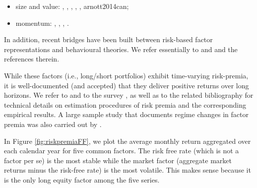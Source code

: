 \documentclass[]{krantz}
\providecommand{\tightlist}{%
  \setlength{\itemsep}{0pt}\setlength{\parskip}{0pt}}
\theoremstyle{definition}
\theoremstyle{definition}
\theoremstyle{definition}
\theoremstyle{remark}
\begin{document}
\begin{itemize}
\tightlist
\item
  size and value: \citet{berk1999optimal},
  \citet{daniel2001overconfidence}, \citet{barberis2003style},
  \citet{gomes2003equilibrium}, \citet{carlson2004corporate},
  arnott2014can;
\item
  momentum: \citet{johnson2002rational}, \citet{grinblatt2005prospect},
  \citet{vayanos2013institutional}, \citet{choi2014momentum}.
\end{itemize}

In addition, recent bridges have been built between risk-based factor
representations and behavioural theories. We refer essentially to
\citet{barberis2016prospect} and \citet{daniel2019short} and the
references therein.

While these factors (i.e., long/short portfolios) exhibit time-varying
risk-premia, it is well-documented (and accepted) that they deliver
positive returns over long horizons. We refer to
\citet{gagliardini2016time} and to the survey
\citet{gagliardini2019estimation}, as well as to the related
bibliography for technical details on estimation procedures of risk
premia and the corresponding empirical results. A large sample study
that documents regime changes in factor premia was also carried out by
\citet{ilmanen2019factor}.

In Figure \ref{fig:riskpremiaFF}, we plot the average monthly return
aggregated over each calendar year for five common factors. The risk
free rate (which is not a factor per se) is the most stable while the
market factor (aggregate market returns minus the risk-free rate) is the
most volatile. This makes sense because it is the only long equity
factor among the five series.

\footnotesize
\end{document}
